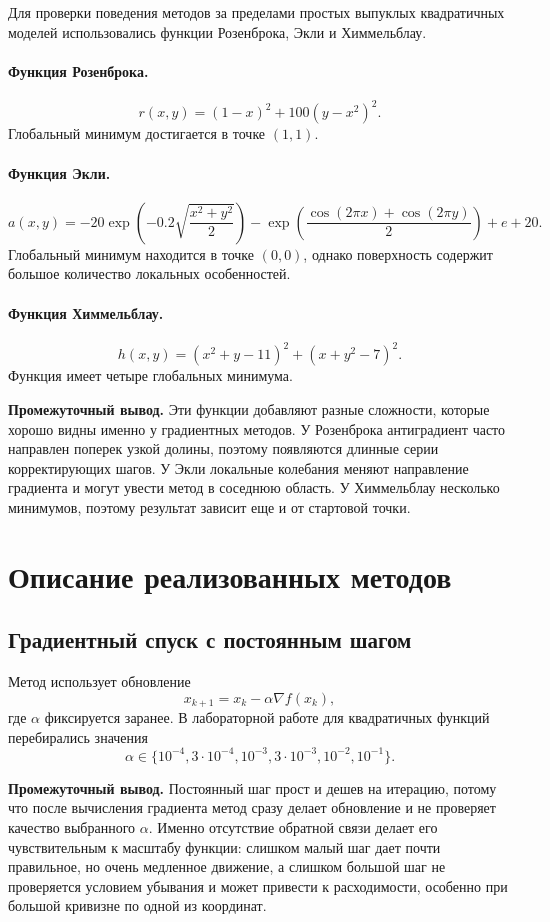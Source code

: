 \documentclass[14pt,a4paper]{extarticle}
\begin{document}
Для проверки поведения методов за пределами простых выпуклых квадратичных моделей использовались функции Розенброка, Экли и Химмельблау.

\paragraph{Функция Розенброка.}
\[
    r(x,y)=(1-x)^2+100(y-x^2)^2.
\]
Глобальный минимум достигается в точке $(1,1)$.

\paragraph{Функция Экли.}
\[
    a(x,y)=-20\exp\left(-0.2\sqrt{\frac{x^2+y^2}{2}}\right)
    -\exp\left(\frac{\cos(2\pi x)+\cos(2\pi y)}{2}\right)+e+20.
\]
Глобальный минимум находится в точке $(0,0)$, однако поверхность содержит большое количество локальных особенностей.

\paragraph{Функция Химмельблау.}
\[
    h(x,y)=(x^2+y-11)^2+(x+y^2-7)^2.
\]
Функция имеет четыре глобальных минимума.

\textbf{Промежуточный вывод.} Эти функции добавляют разные сложности, которые хорошо видны именно у градиентных методов. У Розенброка антиградиент часто направлен поперек узкой долины, поэтому появляются длинные серии корректирующих шагов. У Экли локальные колебания меняют направление градиента и могут увести метод в соседнюю область. У Химмельблау несколько минимумов, поэтому результат зависит еще и от стартовой точки.

\section{Описание реализованных методов}

\subsection{Градиентный спуск с постоянным шагом}

Метод использует обновление
\[
    x_{k+1}=x_k-\alpha\nabla f(x_k),
\]
где $\alpha$ фиксируется заранее. В лабораторной работе для квадратичных функций перебирались значения
\[
    \alpha \in \{10^{-4},3\cdot10^{-4},10^{-3},3\cdot10^{-3},10^{-2},10^{-1}\}.
\]

\textbf{Промежуточный вывод.} Постоянный шаг прост и дешев на итерацию, потому что после вычисления градиента метод сразу делает обновление и не проверяет качество выбранного $\alpha$. Именно отсутствие обратной связи делает его чувствительным к масштабу функции: слишком малый шаг дает почти правильное, но очень медленное движение, а слишком большой шаг не проверяется условием убывания и может привести к расходимости, особенно при большой кривизне по одной из координат.
\end{document}
